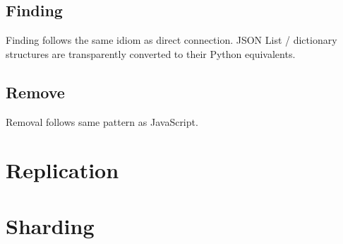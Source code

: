 \documentclass{pgnotes}
\begin{document}
\subsection{Finding}

Finding follows the same idiom as direct connection.
JSON List / dictionary structures are transparently converted to their Python equivalents.

\subsection{Remove}

Removal follows same pattern as JavaScript. 

\section{Replication}

\section{Sharding}



\end{document}
